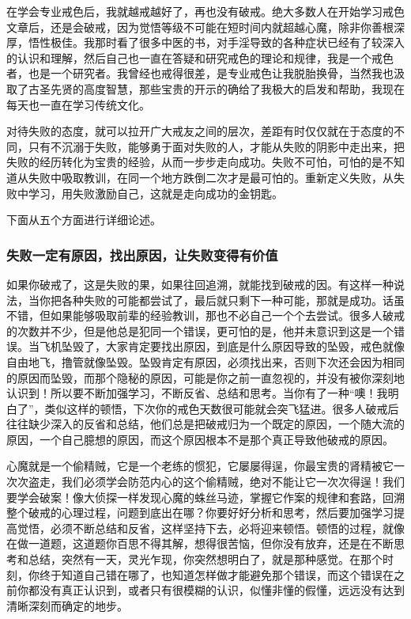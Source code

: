 在学会专业戒色后，我就越戒越好了，再也没有破戒。绝大多数人在开始学习戒色文章后，还是会破戒，因为觉悟等级不可能在短时间内就超越心魔，除非你善根深厚，悟性极佳。我那时看了很多中医的书，对手淫导致的各种症状已经有了较深入的认识和理解，然后自己也一直在答疑和研究戒色的理论和规律，我是一个戒色者，也是一个研究者。我曾经也戒得很差，是专业戒色让我脱胎换骨，当然我也汲取了古圣先贤的高度智慧，那些宝贵的开示的确给了我极大的启发和帮助，我现在每天也一直在学习传统文化。

对待失败的态度，就可以拉开广大戒友之间的层次，差距有时仅仅就在于态度的不同，只有不沉溺于失败，能够勇于面对失败的人，才能从失败的阴影中走出来，把失败的经历转化为宝贵的经验，从而一步步走向成功。失败不可怕，可怕的是不知道从失败中吸取教训，在同一个地方跌倒二次才是最可怕的。重新定义失败，从失败中学习，用失败激励自己，这就是走向成功的金钥匙。

下面从五个方面进行详细论述。

\subsubsection{失败一定有原因，找出原因，让失败变得有价值}

如果你破戒了，这是失败的果，如果往回追溯，就能找到破戒的因。有这样一种说法，当你把各种失败的可能都尝试了，最后就只剩下一种可能，那就是成功。话虽不错，但如果能够吸取前辈的经验教训，那也不必自己一个个去尝试。很多人破戒的次数并不少，但是他总是犯同一个错误，更可怕的是，他并未意识到这是一个错误。当飞机坠毁了，大家肯定要找出原因，到底是什么原因导致的坠毁，戒色就像自由地飞，撸管就像坠毁。坠毁肯定有原因，必须找出来，否则下次还会因为相同的原因而坠毁，而那个隐秘的原因，可能是你之前一直忽视的，并没有被你深刻地认识到！所以要不断加强学习，不断反省、总结和思考。当你有了一种“噢！我明白了”，类似这样的顿悟，下次你的戒色天数很可能就会突飞猛进。很多人破戒后往往缺少深入的反省和总结，他们总是把破戒归为一个既定的原因，一个随大流的原因，一个自己臆想的原因，而这个原因根本不是那个真正导致他破戒的原因。

心魔就是一个偷精贼，它是一个老练的惯犯，它屡屡得逞，你最宝贵的肾精被它一次次盗走，我们必须学会防范内心的这个偷精贼，绝对不能让它一次次得逞！我们要学会破案！像大侦探一样发现心魔的蛛丝马迹，掌握它作案的规律和套路，回溯整个破戒的心理过程，问题到底出在哪？你要好好分析和思考，然后要加强学习提高觉悟，必须不断总结和反省，这样坚持下去，必将迎来顿悟。顿悟的过程，就像在做一道题，这道题你百思不得其解，想得很苦恼，但你没有放弃，还是在不断思考和总结，突然有一天，灵光乍现，你突然想明白了，就是那种感觉。在那个时刻，你终于知道自己错在哪了，也知道怎样做才能避免那个错误，而这个错误在之前你都没有真正认识到，或者只有很模糊的认识，似懂非懂的假懂，远远没有达到清晰深刻而确定的地步。

